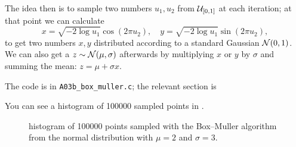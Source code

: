 \documentclass{gulartcl}
\begin{document}
The idea then is to sample two numbers $u_{1}, u_{2}$ from $\mathcal{U}_{[0, 1]}$ at each
iteration; at that point we can calculate
\begin{equation}
    x = \sqrt{-2\log u_1} \cos(2\pi u_2),
    \quad y = \sqrt{-2\log u_1} \sin(2\pi u_2),
\end{equation}
to get two numbers $x, y$ distributed according to a standard Gaussian
$\mathcal{N}(0, 1)$. We can also get a $z \sim \mathcal{N}(\mu, \sigma)$ afterwards by
multiplying $x$ or $y$ by $\sigma$ and summing the mean: $z = \mu + \sigma x$.

The code is in \texttt{A03b\_box\_muller.c}; the relevant section is

You can see a histogram of \num{100000} sampled points in .

\begin{figure}
    \centering
    
    \caption{histogram of \num{100000} points sampled with the Box–Muller
        algorithm from the normal distribution with $\mu = 2$ and $\sigma = 3$.}
    \label{fig:A03b}
\end{figure}
\end{document}

